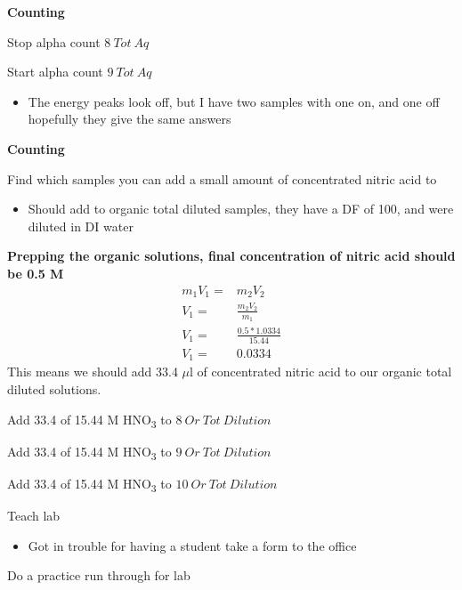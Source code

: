 \documentclass[idxtotoc,hyperref,openany,oneside]{labbook} %
\newcommand{\cmark}{\ding{51}}%
\newcommand{\done}{\rlap{$\square$}{\raisebox{2pt}{\large\hspace{1pt}\cmark}}%
  \hspace{-2.5pt}}
\newcommand{\tsbs}{\textsubscript}
\begin{document}
\textbf{Counting}
\begin{todolist}
\item[\done]{Stop alpha count $\boxed{8\ Tot\ Aq}$}
\item[\done]{Start alpha count $\boxed{9\ Tot\ Aq}$}
  \begin{itemize}
  \item{The energy peaks look off, but I have two samples with one on, and one off
    hopefully they give the same answers}
  \end{itemize}
\end{todolist}
\textbf{Counting}
\begin{todolist}
\item[\done]{Find which samples you can add a small amount of concentrated nitric acid to}
  \begin{itemize}
  \item{Should add to organic total diluted samples, they have a DF of 100, and were
    diluted in DI water}
  \end{itemize}
\end{todolist}
\textbf{Prepping the organic solutions, final concentration of nitric acid should be 0.5 M}
\begin{align*}
  m_1V_1=&m_2V_2\\
  V_1=&\frac{m_2V_2}{m_1}\\
  V_1=&\frac{0.5*1.0334}{15.44}\\
  V_1=&0.0334
\end{align*}
This means we should add 33.4 $\mu$l of concentrated nitric acid to our organic total
diluted solutions.
\begin{todolist}
\item[\done]{Add 33.4 of 15.44 M HNO\tsbs{3} to $\boxed{8\ Or\ Tot\ Dilution}$}
\item[\done]{Add 33.4 of 15.44 M HNO\tsbs{3} to $\boxed{9\ Or\ Tot\ Dilution}$}
\item[\done]{Add 33.4 of 15.44 M HNO\tsbs{3} to $\boxed{10\ Or\ Tot\ Dilution}$}
\end{todolist}







\begin{todolist}
\item[\done]{Teach lab}
  \begin{itemize}
  \item{Got in trouble for having a student take a form to the office}
  \end{itemize}
\item{Do a practice run through for lab}
\end{todolist}
\end{document}
